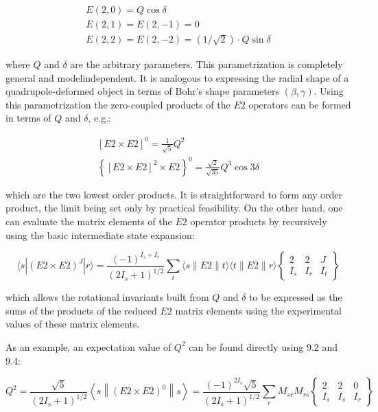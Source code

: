 \documentclass[10pt]{article}
\begin{document}
\begin{gather*}
E(2,0)=Q \cos \delta  \tag{9.1}\\
E(2,1)=E(2,-1)=0 \\
E(2,2)=E(2,-2)=(1 / \sqrt{2}) \cdot Q \sin \delta
\end{gather*}


where $Q$ and $\delta$ are the arbitrary parameters. This parametrization is completely general and modelindependent. It is analogous to expressing the radial shape of a quadrupole-deformed object in terms of Bohr's shape parameters $(\beta, \gamma)$. Using this parametrization the zero-coupled products of the $E 2$ operators can be formed in terms of $Q$ and $\delta$, e.g.:


\begin{gather*}
{[E 2 \times E 2]^{0}=\frac{1}{\sqrt{5}} Q^{2}}  \tag{9.2}\\
\left\{[E 2 \times E 2]^{2} \times E 2\right\}^{0}=\frac{\sqrt{2}}{\sqrt{35}} Q^{3} \cos 3 \delta \tag{9.3}
\end{gather*}


which are the two lowest order products. It is straightforward to form any order product, the limit being set only by practical feasibility. On the other hand, one can evaluate the matrix elements of the $E 2$ operator products by recursively using the basic intermediate state expansion:

\[
\langle s|(E 2 \times E 2)^{J}|r\rangle=\frac{(-1)^{I_{s}+I_{r}}}{\left(2 I_{s}+1\right)^{1 / 2}} \sum_{t}\langle s\|E 2\| t\rangle\langle t\|E 2\| r\rangle\left\{\begin{array}{ccc}
2 & 2 & J  \tag{9.4}\\
I_{s} & I_{r} & I_{t}
\end{array}\right\}
\]

which allows the rotational invariants built from $Q$ and $\delta$ to be expressed as the sums of the products of the reduced $E 2$ matrix elements using the experimental values of these matrix elements.

As an example, an expectation value of $Q^{2}$ can be found directly using 9.2 and 9.4:

\[
Q^{2}=\frac{\sqrt{5}}{\left(2 I_{s}+1\right)^{1 / 2}}\left\langle s\left\|(E 2 \times E 2)^{0}\right\| s\right\rangle=\frac{(-1)^{2 I_{s}} \sqrt{5}}{\left(2 I_{s}+1\right)^{1 / 2}} \sum_{r} M_{s r} M_{r s}\left\{\begin{array}{ccc}
2 & 2 & 0  \tag{9.5}\\
I_{s} & I_{s} & I_{r}
\end{array}\right\}
\]
\end{document}
